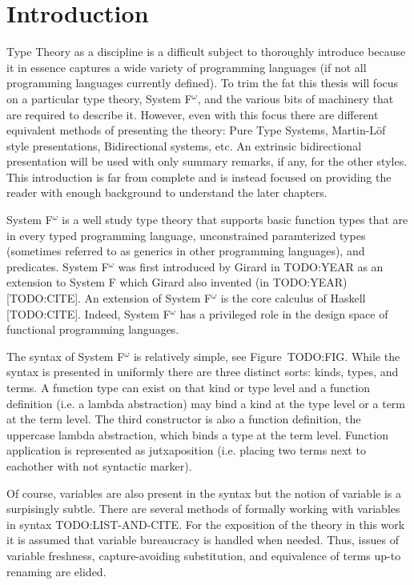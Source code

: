 \chapter{Introduction}

Type Theory as a discipline is a difficult subject to thoroughly introduce because it in essence captures a wide variety of programming languages (if not all programming languages currently defined).
To trim the fat this thesis will focus on a particular type theory, System F$^\omega$, and the various bits of machinery that are required to describe it.
However, even with this focus there are different equivalent methods of presenting the theory: Pure Type Systems, Martin-L\"{o}f style presentations, Bidirectional systems, etc.
An extrinsic bidirectional presentation will be used with only summary remarks, if any, for the other styles.
This introduction is far from complete and is instead focused on providing the reader with enough background to understand the later chapters.

System F$^\omega$ is a well study type theory that supports basic function types that are in every typed programming language, unconstrained paramterized types (sometimes referred to as generics in other programming languages), and predicates.
System F$^\omega$ was first introduced by Girard in TODO:YEAR as an extension to System F which Girard also invented (in TODO:YEAR) [TODO:CITE].
An extension of System F$^\omega$ is the core calculus of Haskell [TODO:CITE].
Indeed, System F$^\omega$ has a privileged role in the design space of functional programming languages.

The syntax of System F$^\omega$ is relatively simple, see Figure~TODO:FIG.
While the syntax is presented in uniformly there are three distinct sorts: kinds, types, and terms.
A function type can exist on that kind or type level and a function definition (i.e. a lambda abstraction) may bind a kind at the type level or a term at the term level.
The third constructor is also a function definition, the uppercase lambda abstraction, which binds a type at the term level.
Function application is represented as jutxaposition (i.e. placing two terms next to eachother with not syntactic marker).

Of course, variables are also present in the syntax but the notion of variable is a surpisingly subtle.
There are several methods of formally working with variables in syntax TODO:LIST-AND-CITE.
For the exposition of the theory in this work it is assumed that variable bureaucracy is handled when needed.
Thus, issues of variable freshness, capture-avoiding substitution, and equivalence of terms up-to renaming are elided.

